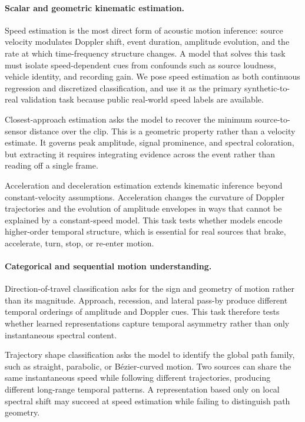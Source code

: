 \documentclass{article}
\begin{document}
\paragraph{Scalar and geometric kinematic estimation.}
Speed estimation is the most direct form of acoustic motion inference: source velocity modulates Doppler shift, event duration, amplitude evolution, and the rate at which time-frequency structure changes. 
A model that solves this task must isolate speed-dependent cues from confounds such as source loudness, vehicle identity, and recording gain. 
We pose speed estimation as both continuous regression and discretized classification, and use it as the primary synthetic-to-real validation task because public real-world speed labels are available.

Closest-approach estimation asks the model to recover the minimum source-to-sensor distance over the clip. 
This is a geometric property rather than a velocity estimate. 
It governs peak amplitude, signal prominence, and spectral coloration, but extracting it requires integrating evidence across the event rather than reading off a single frame.

Acceleration and deceleration estimation extends kinematic inference beyond constant-velocity assumptions. 
Acceleration changes the curvature of Doppler trajectories and the evolution of amplitude envelopes in ways that cannot be explained by a constant-speed model. 
This task tests whether models encode higher-order temporal structure, which is essential for real sources that brake, accelerate, turn, stop, or re-enter motion.

\paragraph{Categorical and sequential motion understanding.}
Direction-of-travel classification asks for the sign and geometry of motion rather than its magnitude. 
Approach, recession, and lateral pass-by produce different temporal orderings of amplitude and Doppler cues. 
This task therefore tests whether learned representations capture temporal asymmetry rather than only instantaneous spectral content.

Trajectory shape classification asks the model to identify the global path family, such as straight, parabolic, or B\'ezier-curved motion. 
Two sources can share the same instantaneous speed while following different trajectories, producing different long-range temporal patterns. 
A representation based only on local spectral shift may succeed at speed estimation while failing to distinguish path geometry.
\end{document}
